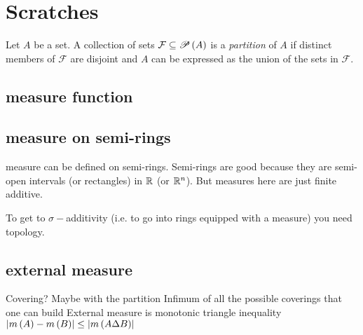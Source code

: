\chapter{Scratches}

\begin{definition}[Partition]\label{def:Partition}
    Let $A$ be a set. A collection of sets $\mathcal{F}\subseteq\mathscr{P}\left( A \right)$ is a \emph{partition} of $A$ if distinct members of $\mathcal{F}$ are disjoint and $A$ can be expressed as the union of the sets in $\mathcal{F}$.
\end{definition}


\section{measure function}
\section{measure on semi-rings}
measure can be defined on semi-rings. Semi-rings are good because they are semi-open intervals (or rectangles) in $\mathbb{ R}$ (or $\mathbb{ R}^{n}$). But measures here are just finite additive.

To get to $\sigma-$additivity (i.e. to go into rings equipped with a measure) you need topology. 
\section{external measure}
Covering? Maybe with the partition
Infimum of all the possible coverings that one can build
External measure is monotonic
triangle inequality $\left\lvert m\left( A \right)-m\left( B \right) \right\rvert\leq\left\lvert m\left( A\Delta B \right) \right\rvert$